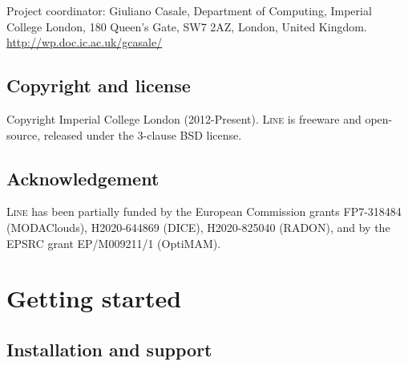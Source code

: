 \noindent Project coordinator:
Giuliano Casale, Department of Computing, Imperial College London, 180 Queen's Gate, SW7 2AZ, London, United Kingdom.
 \url{http://wp.doc.ic.ac.uk/gcasale/}~\\

\section{Copyright and license}
Copyright Imperial College London (2012-Present). \textsc{Line} is freeware and open-source, released under the 3-clause BSD license.



\section{Acknowledgement}
\textsc{Line} has been partially funded by the European Commission grants FP7-318484 (MODAClouds), H2020-644869 (DICE), H2020-825040 (RADON), and by the EPSRC grant EP/M009211/1 (OptiMAM).

\chapter{Getting started}
\label{getting-started}

\section{Installation and support}
\label{installation-and-support}

